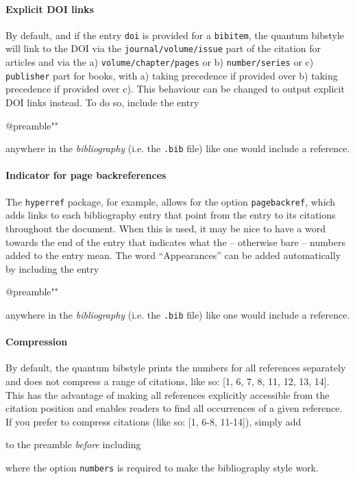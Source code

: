 \documentclass[a4paper,twocolumn,11pt]{quantumarticle}
\begin{document}
\paragraph{Explicit DOI links}
By default, and if the entry \texttt{doi} is provided for a \texttt{bibitem}, the quantum bibstyle will link to the DOI via the \texttt{journal/volume/issue} part of the citation for articles and via the a) \texttt{volume/chapter/pages} or b) \texttt{number/series} or c) \texttt{publisher} part for books, with a) taking precedence if provided over b) taking precedence if provided over c).
This behaviour can be changed to output explicit DOI links instead. To do so, include the entry
\begin{verbatim*}
@preamble{"\MakeDoiLinksExplicit"}
\end{verbatim*}
anywhere in the \emph{bibliography} (i.e. the \texttt{.bib} file) like one would include a reference.

\paragraph{Indicator for page backreferences}
The \texttt{hyperref} package, for example, allows for the option \texttt{pagebackref}, which adds links to each bibliography entry that point from the entry to its citations throughout the document.
When this is used, it may be nice to have a word towards the end of the entry that indicates what the -- otherwise bare -- numbers added to the entry mean.
The word ``Appearances'' can be added automatically by including the entry
\begin{verbatim*}
@preamble{"\PageBackRef"}
\end{verbatim*}
anywhere in the \emph{bibliography} (i.e. the \texttt{.bib} file) like one would include a reference.

\paragraph{Compression}
By default, the quantum bibstyle prints the numbers for all references separately and does not compress
a range of citations, like so: [1, 6, 7, 8, 11, 12, 13, 14].
This has the advantage of making all references explicitly accessible from the citation position and enables readers to find all occurrences of a given reference.
If you prefer to compress citations (like so: [1, 6-8, 11-14]), simply add
\begin{verbatim*}
\end{verbatim*}
to the preamble \emph{before} including
\begin{verbatim*}
\usepackage[numbers]{natbib}
\end{verbatim*}
where the option \texttt{numbers} is required to make the bibliography style work.
\end{document}
